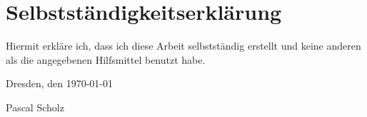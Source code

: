 
\section*{\vfill{} \thispagestyle{empty}
  Selbstständigkeitserklärung}

Hiermit erkläre ich, dass ich diese Arbeit selbstständig erstellt
und keine anderen als die angegebenen Hilfsmittel benutzt habe.
\bigskip{}

\noindent Dresden, den \today{} %
\vspace{2.5cm}

\noindent Pascal Scholz \cleardoublepage{}
